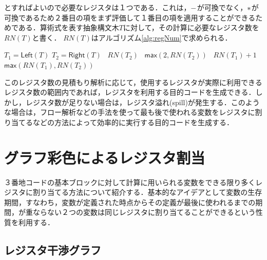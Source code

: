 \documentclass[dvipdfmx,a4j]{jbook}
\begin{document}
とすればよいので必要なレジスタは１つである．これは，${\tt -}$が可換でなく，${\tt *}$が可換であるため２番目の項をまず評価して１番目の項を適用することができるためである．算術式を表す抽象構文木$T$に対して，その計算に必要なレジスタ数を$RN(T)$と書く．
$RN(T)$はアルゴリズム\ref{alg:regNum}で求められる．

\begin{algorithm}
    \caption{$RN(T)$の計算}\label{alg:regNum}
    \begin{algorithmic}
         
        \Else
        \State $T_1=\mathsf{Left}(T)$ 
        \State $T_2=\mathsf{Right}(T)$ 
         
        \Else
        \
        \Return $RN(T_2)$ 
        \Else\
        \Return $\mathsf{max}(2,RN(T_2))$ 
        \EndIf
        \Else
        \
        \Return $RN(T_1)+1$
        \Else\
        \Return $\mathsf{max}(RN(T_1),RN(T_2))$
        \EndIf
        \EndIf
        \EndIf
        \EndIf
        \EndIf
        \EndProcedure
    \end{algorithmic}
\end{algorithm}

このレジスタ数の見積もり解析に応じて，使用するレジスタが実際に利用できるレジスタ数の範囲内であれば，レジスタを利用する目的コードを生成できる．しかし，レジスタ数が足りない場合は，レジスタ溢れ(spill)が発生する．このような場合は，フロー解析などの手法を使って最も後で使われる変数をレジスタに割り当てるなどの方法によって効率的に実行する目的コードを生成する．

\section{グラフ彩色によるレジスタ割当}

３番地コードの基本ブロックに対して計算に用いられる変数をできる限り多くレジスタに割り当てる方法について紹介する．基本的なアイデアとして変数の生存期間，すなわち，変数が定義された時点からその定義が最後に使われるまでの期間，が重ならない２つの変数は同じレジスタに割り当てることができるという性質を利用する．

\subsection{レジスタ干渉グラフ}
\end{document}
